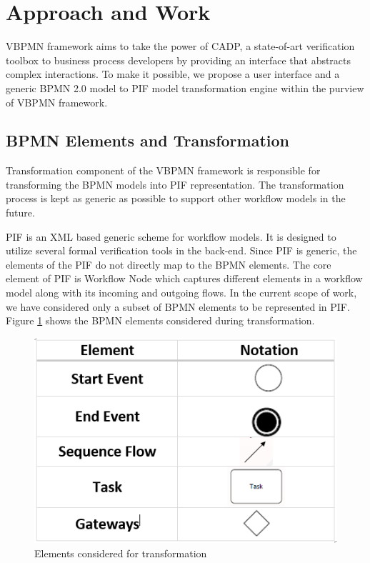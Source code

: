 \documentclass{article}
\begin{document}
\section{Approach and Work}
VBPMN framework aims to take the power of CADP, a state-of-art verification toolbox to business process developers by providing an interface that abstracts complex interactions. To make it possible, we propose a user interface and a generic BPMN 2.0 model to PIF model transformation engine within the purview of VBPMN framework. 

\subsection{BPMN Elements and Transformation}
Transformation component of the VBPMN framework is responsible for transforming the BPMN models into PIF representation. The transformation process is kept as generic as possible to support other workflow models in the future. 

PIF is an XML based generic scheme for workflow models. It is designed to utilize several formal verification tools in the back-end. Since PIF is generic, the elements of the PIF do not directly map to the BPMN elements. The core element of PIF is Workflow Node which captures different elements in a workflow model along with its incoming and outgoing flows. In the current scope of work, we have considered only a subset of BPMN elements to be represented in PIF. Figure \ref{fig:elements} shows the BPMN elements considered during transformation.

\begin{figure}[h]
\center
\includegraphics[scale =0.6]{Table1.png}
\caption{Elements considered for transformation}
\label{fig:elements}
\end{figure}
\end{document}
